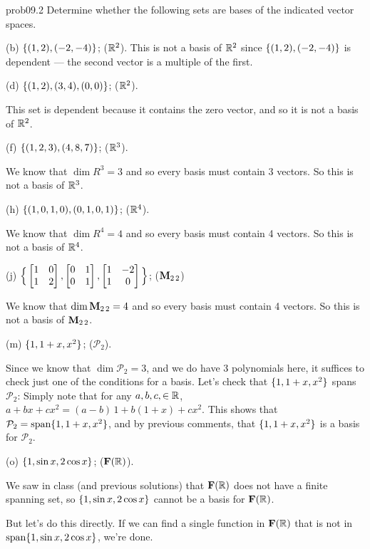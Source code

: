\begin{sol}{prob09.2} Determine whether   the following  sets are bases of the indicated vector spaces.  
  \medskip

(b) $\{(1,2), (-2,-4) \} $; ($\mathbb{R}^2$).
\soln This is not a basis of $\mathbb{R}^2$ since $\{(1,2), (-2,-4) \} $ is dependent --- the second vector is a multiple of the first.\medskip


(d) $\{(1,2), (3,4), (0,0) \} $; ($\mathbb{R}^2$).

\soln This set is dependent because it contains the zero vector, and so it is not a basis of $\mathbb{R}^2$.\medskip


(f) $\{(1,2,3), (4,8,7) \}$; ($\mathbb{R}^3$).

\soln We know that $\dim R^3=3$ and so every basis must contain 3 vectors. So this is not a basis of $\mathbb{R}^3$.\medskip
%


(h) $\{(1,0,1,0), (0,1,0,1) \}$; ($\mathbb{R}^4$).

\soln We know that $\dim R^4=4$ and so every basis must contain 4 vectors. So this is not a basis of $\mathbb{R}^4$.

\medskip
%


(j)  $\Big\{\bmatrix 1&0\\1&2\endbmatrix, \bmatrix 0&1\\0&1\endbmatrix , \bmatrix 1&-2\\1&0\endbmatrix \Big\}$; ($\mathbf{M}_{2 \,2}$)

\soln We know that $\dim  \mathbf{M}_{2 \,2} =4$ and so every basis must contain 4 vectors. So this is not a basis of $\mathbf{M}_{2 \,2}$.


\medskip

(m)  $\{1, 1+x, x^2 \}$; ($\mathcal P_2$). 

\soln Since we know that $\dim \mathcal P_2=3$, and we do have 3 polynomials here, it suffices to check just one of the conditions for a basis. Let's check that $\{1, 1+x, x^2 \}$ spans $\mathcal P_2$: Simply note that for any $a,b,c,\in \mathbb{R}$, $a+bx +cx^2= (a-b)\, 1 + b(1+x) +c x^2$. This shows that $\mathcal P_2=\textrm{span}\{1, 1+x, x^2\}$, and by previous comments, that $\{1, 1+x, x^2 \}$ is a basis for $\mathcal P_2$.
\medskip 
 
(o) $\{1, \sin x, 2 \cos x \}$; ($\mathbf{F}(\mathbb{R})$).

\soln We saw in class (and previous solutions) that  $\mathbf{F}(\mathbb{R})$ does not have a finite spanning set, so $\{1, \sin x, 2 \cos x \}$ cannot be a basis for $\mathbf{F}(\mathbb{R})$. 

But let's do this directly. If we can find a single function in $\mathbf{F}(\mathbb{R})$ that is not in $\textrm{span}\{1, \sin x, 2 \cos x\}$, we're done. 


\end{sol}
